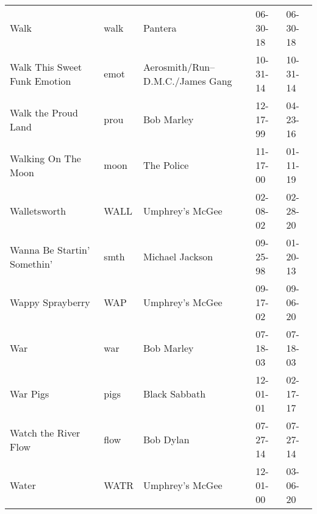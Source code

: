 \begin{longtable}{p{}p{}p{}p{}p{}}
                                                                    Walk &          walk &                                                  Pantera &              06-30-18 &             06-30-18 \\
                                            Walk This Sweet Funk Emotion &          emot &                          Aerosmith/Run–D.M.C./James Gang &              10-31-14 &             10-31-14 \\
                                                     Walk the Proud Land &          prou &                                               Bob Marley &              12-17-99 &             04-23-16 \\
                                                     Walking On The Moon &          moon &                                               The Police &              11-17-00 &             01-11-19 \\
                                                            Walletsworth &          WALL &                                          Umphrey's McGee &              02-08-02 &             02-28-20 \\
                                             Wanna Be Startin' Somethin' &          smth &                                          Michael Jackson &              09-25-98 &             01-20-13 \\
                                                        Wappy Sprayberry &           WAP &                                          Umphrey's McGee &              09-17-02 &             09-06-20 \\
                                                                     War &           war &                                               Bob Marley &              07-18-03 &             07-18-03 \\
                                                                War Pigs &          pigs &                                            Black Sabbath &              12-01-01 &             02-17-17 \\
                                                    Watch the River Flow &          flow &                                                Bob Dylan &              07-27-14 &             07-27-14 \\
                                                                   Water &          WATR &                                          Umphrey's McGee &              12-01-00 &             03-06-20 \\

\end{longtable}
